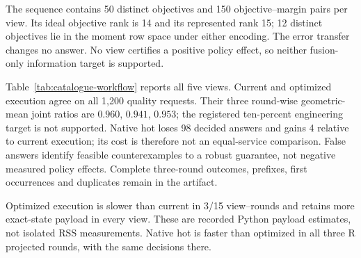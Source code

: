 


The sequence contains 50 distinct objectives and 150 objective--margin pairs per view. Its ideal objective rank is 14 and its represented rank 15; 12 distinct objectives lie in the moment row space under either encoding. The error transfer changes no answer. No view certifies a positive policy effect, so neither fusion-only information target is supported.

Table~\ref{tab:catalogue-workflow} reports all five views. Current and optimized execution agree on all 1,200 quality requests. Their three round-wise geometric-mean joint ratios are $0.960$, $0.941$, $0.953$; the registered ten-percent engineering target is not supported. Native hot loses 98 decided answers and gains 4 relative to current execution; its cost is therefore not an equal-service comparison. False answers identify feasible counterexamples to a robust guarantee, not negative measured policy effects. Complete three-round outcomes, prefixes, first occurrences and duplicates remain in the artifact.

Optimized execution is slower than current in 3/15 view--rounds and retains more exact-state payload in every view. These are recorded Python payload estimates, not isolated RSS measurements. Native hot is faster than optimized in all three R projected rounds, with the same decisions there.
